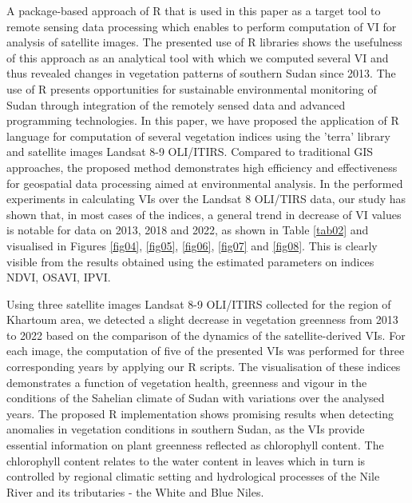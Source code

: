 \documentclass[jimaging,article,submit,pdftex,moreauthors]{Definitions/mdpi}
\begin{document}
A package-based approach of R that is used in this paper as a target tool to remote sensing data processing which enables to perform computation of VI for analysis of satellite images. The presented use of R libraries shows the usefulness of this approach as an analytical tool with which we computed several VI and thus revealed changes in vegetation patterns of southern Sudan since 2013. The use of R presents opportunities for sustainable environmental monitoring of Sudan through integration of the remotely sensed data and advanced programming technologies. In this paper, we have proposed the application of R language for computation of several vegetation indices using the 'terra' library and satellite images Landsat 8-9 OLI/ITIRS. Compared to traditional GIS approaches, the proposed method demonstrates high efficiency and effectiveness for geospatial data processing aimed at environmental analysis. In the performed experiments in calculating VIs over the Landsat 8 OLI/TIRS data, our study has shown that, in most cases of the indices, a general trend in decrease of VI values is notable for data on 2013, 2018 and 2022, as shown in Table \ref{tab02} and visualised in Figures \ref{fig04}, \ref{fig05}, \ref{fig06}, \ref{fig07} and \ref{fig08}. This is clearly visible from the results obtained using the estimated parameters on indices NDVI, OSAVI, IPVI. 

Using three satellite images Landsat 8-9 OLI/ITIRS collected for the region of Khartoum area, we detected a slight decrease in vegetation greenness from 2013 to 2022 based on the comparison of the dynamics of the satellite-derived VIs. For each image, the computation of five of the presented VIs was performed for three corresponding years by applying our R scripts. The visualisation of these indices demonstrates a function of vegetation health, greenness and vigour in the conditions of the Sahelian climate of Sudan with variations over the analysed years. The proposed R implementation shows promising results when detecting anomalies in vegetation conditions in southern Sudan, as the VIs provide essential information on plant greenness reflected as chlorophyll content. The chlorophyll content relates to the water content in leaves which in turn is controlled by regional climatic setting and hydrological processes of the Nile River and its tributaries - the White and Blue Niles. 
\end{document}

